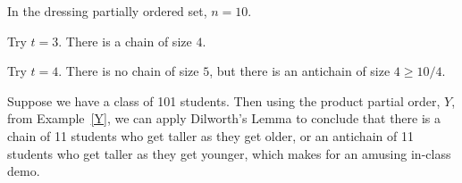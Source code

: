 \begin{example}
In the dressing partially ordered set, $n = 10$.

Try $t = 3$.  There is a chain of size $4$.

Try $t = 4$.  There is no chain of size $5$, but there is an antichain of
size $4 \geq 10 / 4$.
\end{example}

\begin{example}
Suppose we have a class of 101 students.  Then using the product partial
order, $Y$, from Example~\ref{Y}, we can apply Dilworth's Lemma to
conclude that there is a chain of 11 students who get taller as they get
older, or an antichain of 11 students who get taller as they get younger,
which makes for an amusing in-class demo.
\end{example}

\begin{problems}
\practiceproblems
{}

\classproblems
{}

\homeworkproblems
{}

\end{problems}


\endinput
